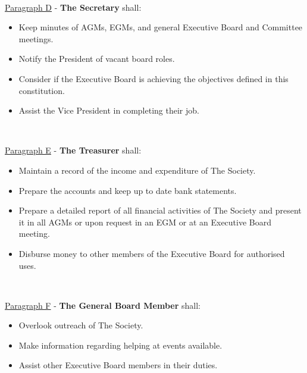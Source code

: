 ~

\underline{Paragraph D} - \textbf{The Secretary} shall:

\begin{itemize}

    \item{Keep minutes of AGMs, EGMs, and general Executive Board and Committee meetings.}

    \item{Notify the President of vacant board roles.}

    \item{Consider if the Executive Board is achieving the objectives defined in this constitution.}

    \item{Assist the Vice President in completing their job.}

\end{itemize}

~

\underline{Paragraph E} - \textbf{The Treasurer} shall:

\begin{itemize}

    \item{Maintain a record of the income and expenditure of The Society.}

    \item{Prepare the accounts and keep up to date bank statements.}

    \item{Prepare a detailed report of all financial activities of The Society and present it in all AGMs or upon request in an EGM or at an Executive Board meeting.}

    \item{Disburse money to other members of the Executive Board for authorised uses.}

\end{itemize}

~

\underline{Paragraph F} - \textbf{The General Board Member}
shall:

\begin{itemize}

    \item{Overlook outreach of The Society.}

    \item{Make information regarding helping at events available.}

    \item{Assist other Executive Board members in their duties.}

\end{itemize}
